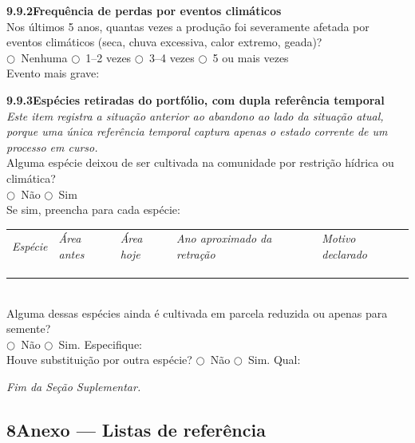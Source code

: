 \medskip\noindent\textbf{9.9.2\quad Frequência de perdas por eventos climáticos}\\[2pt]
Nos últimos 5 anos, quantas vezes a produção foi severamente afetada por eventos climáticos (seca, chuva excessiva, calor extremo, geada)?\\
$\bigcirc$~Nenhuma \quad $\bigcirc$~1--2 vezes \quad $\bigcirc$~3--4 vezes \quad $\bigcirc$~5 ou mais vezes\\[2pt]
Evento mais grave: \dotfill

\medskip\noindent\textbf{9.9.3\quad Espécies retiradas do portfólio, com dupla referência temporal}\\[2pt]
\textit{Este item registra a situação anterior ao abandono ao lado da situação atual, porque uma única referência temporal captura apenas o estado corrente de um processo em curso.}\\[2pt]
Alguma espécie deixou de ser cultivada na comunidade por restrição hídrica ou climática?\\
$\bigcirc$~Não \quad $\bigcirc$~Sim\\[2pt]
Se sim, preencha para cada espécie:\\[2pt]
\begin{tabular}{p{2.8cm}p{2.6cm}p{2.6cm}p{2.4cm}p{2.4cm}}
\textit{Espécie} & \textit{Área antes} & \textit{Área hoje} & \textit{Ano aproximado da retração} & \textit{Motivo declarado} \\
\dotfill & \dotfill & \dotfill & \dotfill & \dotfill \\
\dotfill & \dotfill & \dotfill & \dotfill & \dotfill \\
\dotfill & \dotfill & \dotfill & \dotfill & \dotfill \\
\end{tabular}\\[4pt]
Alguma dessas espécies ainda é cultivada em parcela reduzida ou apenas para semente?\\
$\bigcirc$~Não \quad $\bigcirc$~Sim. Especifique: \dotfill\\[2pt]
Houve substituição por outra espécie? \quad $\bigcirc$~Não \quad $\bigcirc$~Sim. Qual: \dotfill

\bigskip\noindent\textit{Fim da Seção Suplementar.}

\subsection*{8\quad Anexo --- Listas de referência}

